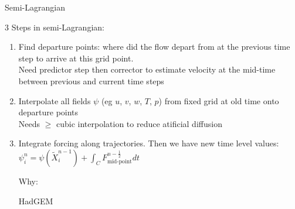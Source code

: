 \begin{slide}{Semi-Lagrangian}

3 Steps in semi-Lagrangian:
\begin{enumerate}
\item Find departure points: where did the flow depart from at the previous time step to arrive at this grid point. \\
Need predictor step then corrector to estimate velocity at the mid-time between previous and current time steps

\item Interpolate all fields $\psi$ (eg $u$, $v$, $w$, $T$, $p$) from fixed grid at old time onto departure points \\
Needs $\ge$ cubic interpolation to reduce atificial diffusion
\item Integrate forcing along trajectories. Then we have new time level values:\\
$\psi^n_i = \psi(\tilde{X}^{n-1}_i) + \int_C F^{n-\frac{1}{2}}_\text{mid-point} dt$

\hspace{-3ex}Why:

\hspace{-3ex}HadGEM
\end{enumerate}

\end{slide}

